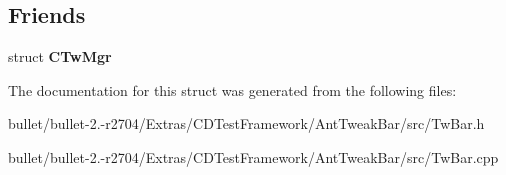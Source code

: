 \subsection*{Friends}
\begin{DoxyCompactItemize}
\item 
\hypertarget{struct_c_tw_bar_a23aafc77a1e9d5c5eabaf30cb69e0613}{struct {\bfseries C\+Tw\+Mgr}}\label{struct_c_tw_bar_a23aafc77a1e9d5c5eabaf30cb69e0613}

\end{DoxyCompactItemize}


The documentation for this struct was generated from the following files\+:\begin{DoxyCompactItemize}
\item 
bullet/bullet-\/2.-\/r2704/\+Extras/\+C\+D\+Test\+Framework/\+Ant\+Tweak\+Bar/src/Tw\+Bar.\+h\item 
bullet/bullet-\/2.-\/r2704/\+Extras/\+C\+D\+Test\+Framework/\+Ant\+Tweak\+Bar/src/Tw\+Bar.\+cpp\end{DoxyCompactItemize}
